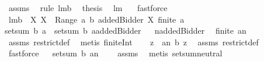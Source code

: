 \begin{isabellebody}
\isamarkupfalse%
\ assms\ \isamarkupfalse%
\ {\isacharparenleft}rule\ lm{}{}b{\isacharparenright}\ \isamarkupfalse%
\ {\isacharquery}thesis\ \isamarkupfalse%
\ lm{}{}\ \ \isamarkupfalse%
\ fastforce\ \isamarkupfalse%
%
\endisatagproof
{\isafoldproof}%
%
\isadelimproof
%
\endisadelimproof
\isanewline
\isanewline
{}\isamarkupfalse%
\ lm{}{}b{\isacharcolon}\ \ {\isachardoublequoteopen}{\isasymforall}X{\isachardot}\ X\ {\isasymin}\ Range\ a\ {\isasymlongrightarrow}b\ {\isacharparenleft}addedBidder{\isacharprime}{\isacharcomma}\ X{\isacharparenright}{\isacharequal}{}{\isachardoublequoteclose}\ {\isachardoublequoteopen}finite\ a{\isachardoublequoteclose}\ \ \isanewline
{\isachardoublequoteopen}setsum\ b\ a\ {\isacharequal}\ setsum\ b\ {\isacharparenleft}a{\isacharminus}{\isacharminus}addedBidder{\isacharprime}{\isacharparenright}{\isachardoublequoteclose}\isanewline
%
\isadelimproof
%
\endisadelimproof
%
\isatagproof
{}\isamarkupfalse%
\ {\isacharminus}\isanewline
{}\isamarkupfalse%
\ {\isacharquery}n{\isacharequal}addedBidder{\isacharprime}\ \isamarkupfalse%
\ {\isachardoublequoteopen}finite\ {\isacharparenleft}a{\isacharbar}{\isacharbar}{\isacharbraceleft}{\isacharquery}n{\isacharbraceright}{\isacharparenright}{\isachardoublequoteclose}\ \isamarkupfalse%
\ assms\ restrict{\isacharunderscore}def\ \isamarkupfalse%
\ {\isacharparenleft}metis\ finite{\isacharunderscore}Int{\isacharparenright}\ \isanewline
{}\isamarkupfalse%
\ \isamarkupfalse%
\ {\isachardoublequoteopen}{\isasymforall}z\ {\isasymin}\ a{\isacharbar}{\isacharbar}{\isacharbraceleft}{\isacharquery}n{\isacharbraceright}{\isachardot}\ b\ z{\isacharequal}{}{\isachardoublequoteclose}\ \isamarkupfalse%
\ assms\ restrict{\isacharunderscore}def\ \isamarkupfalse%
\ fastforce\isanewline
{}\isamarkupfalse%
\ \isamarkupfalse%
\ {\isachardoublequoteopen}setsum\ b\ {\isacharparenleft}a{\isacharbar}{\isacharbar}{\isacharbraceleft}{\isacharquery}n{\isacharbraceright}{\isacharparenright}\ {\isacharequal}\ {}{\isachardoublequoteclose}\ \isamarkupfalse%
\ assms\ \isamarkupfalse%
\ {\isacharparenleft}metis\ setsum{\isachardot}neutral{\isacharparenright}\isanewline

\end{isabellebody}
